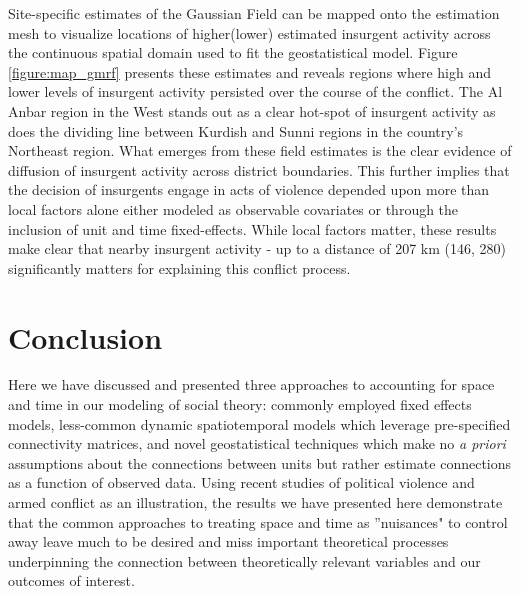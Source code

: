 \documentclass[12pt]{article}
\begin{document}
Site-specific estimates of the Gaussian Field can be mapped onto the estimation mesh to visualize locations of higher(lower) estimated insurgent activity across the continuous spatial domain used to fit the geostatistical model. Figure \ref{figure:map_gmrf} presents these estimates and reveals regions where high and lower levels of insurgent activity persisted over the course of the conflict. The Al Anbar region in the West stands out as a clear hot-spot of insurgent activity as does the dividing line between Kurdish and Sunni regions in the country's Northeast region. What emerges from these field estimates is the clear evidence of diffusion of insurgent activity across district boundaries. This further implies that the decision of insurgents engage in acts of violence depended upon more than local factors alone either modeled as observable covariates or through the inclusion of unit and time fixed-effects. While local factors matter, these results make clear that nearby insurgent activity - up to a distance of 207 km (146, 280) significantly matters for explaining this conflict process.






\section{Conclusion}

Here we have discussed and presented three approaches to accounting for space and time in our modeling of social theory: commonly employed fixed effects models, less-common dynamic spatiotemporal models which leverage pre-specified connectivity matrices, and novel geostatistical techniques which make no \textit{a priori} assumptions about the connections between units but rather estimate connections as a function of observed data. Using recent studies of political violence and armed conflict as an illustration, the results we have presented here demonstrate that the common approaches to treating space and time as ''nuisances" to control away leave much to be desired and miss important theoretical processes underpinning the connection between theoretically relevant variables and our outcomes of interest.
\end{document}
